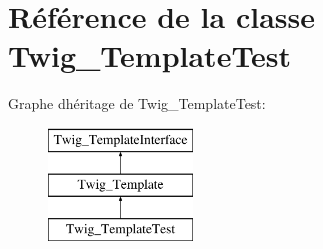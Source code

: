 \hypertarget{class_twig___template_test}{}\section{Référence de la classe Twig\+\_\+\+Template\+Test}
\label{class_twig___template_test}
Graphe d\textquotesingle{}héritage de Twig\+\_\+\+Template\+Test\+:\begin{figure}[H]
\begin{center}
\leavevmode
\includegraphics[height=3.000000cm]{class_twig___template_test}
\end{center}
\end{figure}
